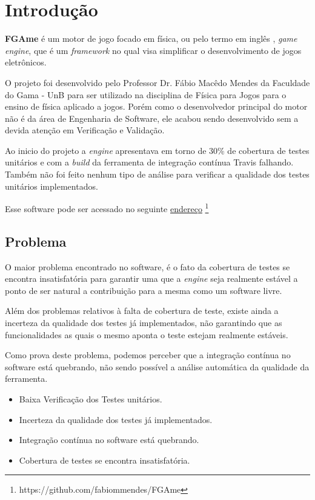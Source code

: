 \chapter[Introdução]{Introdução}
\textbf{FGAme} é um motor de jogo focado em física, ou pelo termo em inglês , \textit{game} \textit{engine}, que é um \textit{framework} no qual visa simplificar o desenvolvimento de jogos eletrônicos.

O projeto foi desenvolvido pelo Professor Dr. Fábio Macêdo Mendes da Faculdade do Gama - UnB para ser utilizado na disciplina de Física para Jogos para o ensino de física aplicado a jogos. Porém como o desenvolvedor principal do motor não é da área de Engenharia de Software, ele acabou sendo desenvolvido sem a devida atenção em Verificação e Validação.

Ao inicio do projeto a \textit{engine} apresentava em torno de 30\% de cobertura de testes unitários e com a \textit{build} da ferramenta de integração contínua Travis falhando. Também não foi feito nenhum tipo de análise para verificar a qualidade dos testes unitários implementados.



Esse software pode ser acessado no seguinte \href{https://github.com/fabiommendes/FGAme}{endereço}%
\footnote{https://github.com/fabiommendes/FGAme}

\section{Problema}

O maior problema encontrado no software, é o fato da cobertura de testes se encontra insatisfatória para garantir uma que a \textit{engine} seja realmente estável a ponto de ser natural a contribuição para a mesma como um software livre.
    
Além dos problemas relativos à falta de cobertura de teste, existe ainda a incerteza da qualidade dos testes já implementados, não garantindo que as funcionalidades as quais o mesmo aponta o teste estejam realmente estáveis.

Como prova deste problema, podemos perceber que a integração contínua no software está quebrando, não sendo possível a análise automática da qualidade da ferramenta.

\begin{itemize}
\item Baixa Verificação dos Testes unitários.
\item Incerteza da qualidade dos testes já implementados.
\item Integração contínua no software está quebrando.
\item Cobertura de testes se encontra insatisfatória.
\end{itemize}



